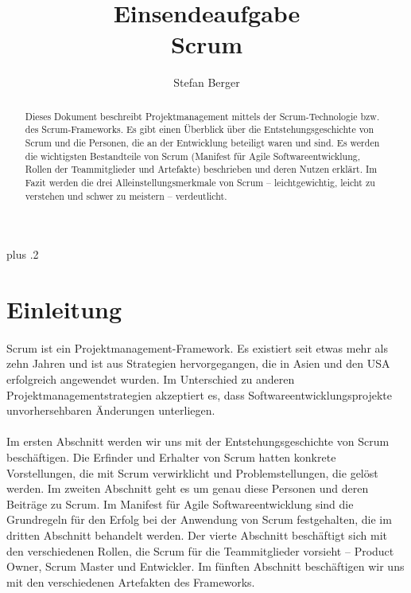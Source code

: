 \documentclass{article}
\begin{document}
\title{\Large Einsendeaufgabe \\ Scrum}
\author{\normalsize Stefan Berger}
\date{}
\maketitle

\pagebreak

\tableofcontents

\pagebreak

\hspace{50px}

\begin{abstract}
Dieses Dokument beschreibt Projektmanagement mittels der Scrum-Technologie bzw. des Scrum-Frame\-works. Es gibt einen Überblick über die Entstehungsgeschichte von Scrum und die Personen, die an der Entwicklung beteiligt waren und sind. Es werden die wichtigsten Bestandteile von Scrum (Manifest für Agile Softwareentwicklung, Rollen der Teammitglieder und Artefakte) beschrieben und deren Nutzen erklärt. Im Fazit werden die drei Alleinstellungsmerkmale von Scrum – leichtgewichtig, leicht zu verstehen und schwer zu meistern – verdeutlicht.
\end{abstract}

\vspace{50px}

\raggedright\rightskip=0pt plus .2\hsize

\section{Einleitung}
\paragraph{}
Scrum ist ein Projektmanagement-Framework. Es existiert seit etwas mehr als zehn Jahren und ist aus Strategien hervorgegangen, die in Asien und den USA erfolgreich angewendet wurden. Im Unterschied zu anderen Projektmanagementstrategien akzeptiert es, dass Softwareentwicklungsprojekte unvorhersehbaren Änderungen unterliegen.

\paragraph{}
Im ersten Abschnitt werden wir uns mit der Entstehungsgeschichte von Scrum beschäftigen. Die Erfinder und Erhalter von Scrum hatten konkrete Vorstellungen, die mit Scrum verwirklicht und Problemstellungen, die gelöst werden. Im zweiten Abschnitt geht es um genau diese Personen und deren Beiträge zu Scrum. Im Manifest für Agile Softwareentwicklung sind die Grundregeln für den Erfolg bei der Anwendung von Scrum festgehalten, die im dritten Abschnitt behandelt werden. Der vierte Abschnitt beschäftigt sich mit den verschiedenen Rollen, die Scrum für die Teammitglieder vorsieht – Product Owner, Scrum Master und Entwickler. Im fünften Abschnitt beschäftigen wir uns mit den verschiedenen Artefakten des Frameworks.
\end{document}
